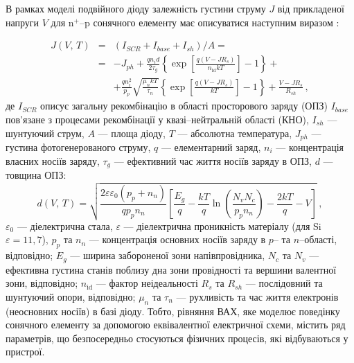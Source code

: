 В рамках моделі подвійного діоду залежність густини струму $J$ від прикладеної напруги $V$ для  n$^+$--p сонячного елементу має описуватися
наступним виразом \cite{2Diod:Ishaque,2Diod:Buhler}:

\begin{eqnarray}
\label{eqSSCIV}
\nonumber J(V,\,T)&=&\left(I_{SCR}+I_{base}+I_{sh}\right)/A=\\
\nonumber &=&-J_{ph}+\frac{qn_id}{2\tau_{g}}\left\{\exp \left[\frac{q(V-JR_s)}{n_\mathrm{id}kT}\right]-1\right\}+\\
&&+\frac{qn_i^2}{p_p}\sqrt{\frac{\mu_nkT}{\tau_n}}\left\{\exp \left[\frac{q(V-JR_s)}{kT}\right]-1\right\}+\frac{V-JR_s}{R_{sh}}\,,
\end{eqnarray}
де
$I_{SCR}$ описує загальну рекомбінацію в області просторового заряду (ОПЗ)
$I_{base}$ пов'язане з процесами рекомбінації у квазі--нейтральній області (КНО),
$I_{sh}$ --- шунтуючий струм,
$A$ --- площа діоду,
$T$ --- абсолютна температура,
$J_{ph}$ --- густина фотогенерованого струму,
$q$ --- елементарний заряд,
$n_i$ --- концентрація власних носіїв заряду,
$\tau_{g}$  --- ефективний час життя носіїв заряду в ОПЗ,
$d$ --- товщина ОПЗ:
\begin{equation}
\label{eqW}
    d(V,\,T)=\sqrt{\frac{2 \varepsilon \varepsilon_0(p_p+n_n)}{q p_p n_n}\left[\frac{E_g}{q}-\frac{kT}{q}\ln\left(\frac{N_vN_c}{p_pn_n}\right)-\frac{2kT}{q}-V\right]} \,,
\end{equation}
$\varepsilon_0$ --- діелектрична стала,
$\varepsilon$ --- діелектрична проникність матеріалу (для Si $\varepsilon=11,7$),
$p_p$ та $n_n$ --- концентрація основних носіїв заряду в $p$-- та $n$--області, відповідно;
$E_g$ --- ширина забороненої зони напівпровідника,
$N_c$ та $N_v$ --- ефективна густина станів поблизу дна зони провідності та вершини валентної зони, відповідно;
$n_\mathrm{id}$ --- фактор неідеальності
$R_s$ та $R_{sh}$ --- послідовний та шунтуючий опори, відповідно;
$\mu_n$ та $\tau_n$ --- рухливість та час життя електронів (неосновних носіїв) в базі діоду.
Тобто,
рівняння ВАХ, яке моделює поведінку сонячного елементу за допомогою еквівалентної електричної схеми,
містить ряд параметрів, що безпосередньо стосуються фізичних процесів, які відбуваються у пристрої.


